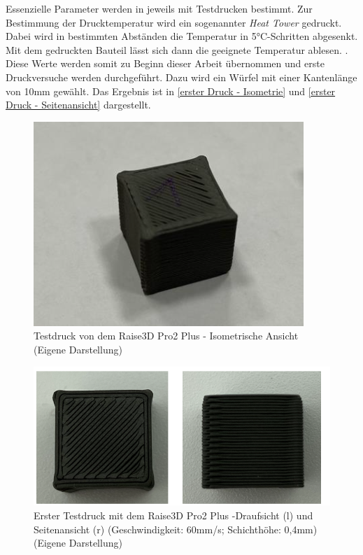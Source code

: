 Essenzielle Parameter werden in \Autocite{M.Mickan} jeweils mit Testdrucken bestimmt. Zur Bestimmung der Drucktemperatur wird ein sogenannter \textit{Heat Tower} gedruckt. Dabei wird in bestimmten Abständen die Temperatur in 5°C-Schritten abgesenkt. Mit dem gedruckten Bauteil lässt sich dann die geeignete Temperatur ablesen. \Autocite{M.Mickan}.\\

Diese Werte werden somit zu Beginn dieser Arbeit übernommen und erste Druckversuche werden durchgeführt. Dazu wird ein Würfel mit einer Kantenlänge von 10mm gewählt. Das Ergebnis ist in \autoref{erster Druck - Isometrie} und \autoref{erster Druck - Seitenansicht} dargestellt.


\begin{figure}[h]
	\centering
	\includegraphics[width=0.5\linewidth]{bilder/Testdruck auf Raise Pro 3D.png}
        \caption[Testdruck von dem Raise3D Pro2 Plus - Isometrische Ansicht] {Testdruck von dem Raise3D Pro2 Plus - Isometrische Ansicht (Eigene Darstellung)}
	\label{erster Druck - Isometrie}
\end{figure}
\begin{figure}[h]
	\centering
	\includegraphics[width=\linewidth]{bilder/Testdruck auf Raise Pro 3D Seitenansicht - Draufsicht.png}
        \caption[Erster Testdruck mit dem Raise3D Pro2 Plus - Seitenansicht und Draufsicht] {Erster Testdruck mit dem Raise3D Pro2 Plus -Draufsicht (l) und Seitenansicht (r) (Geschwindigkeit: 60mm/s; Schichthöhe: 0,4mm) (Eigene Darstellung)}
	\label{erster Druck - Seitenansicht}
\end{figure}


